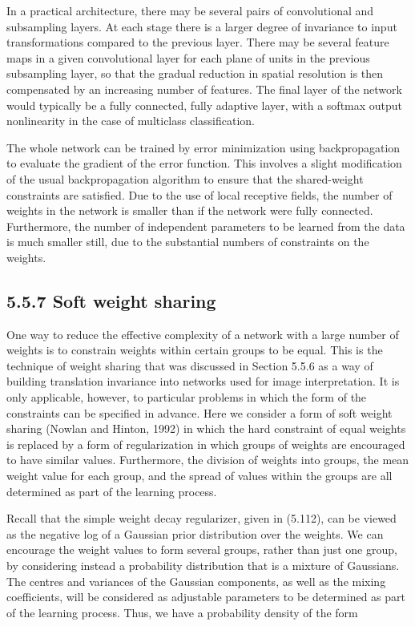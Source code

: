 \documentclass[
  10
]{article}
\begin{document}
In a practical architecture, there may be several pairs of convolutional
and subsampling layers. At each stage there is a larger degree of
invariance to input transformations compared to the previous layer.
There may be several feature maps in a given convolutional layer for
each plane of units in the previous subsampling layer, so that the
gradual reduction in spatial resolution is then compensated by an
increasing number of features. The final layer of the network would
typically be a fully connected, fully adaptive layer, with a softmax
output nonlinearity in the case of multiclass classification.

The whole network can be trained by error minimization using
backpropagation to evaluate the gradient of the error function. This
involves a slight modification of the usual backpropagation algorithm to
ensure that the shared-weight constraints are satisfied. Due to the use
of local receptive fields, the number of weights in the network is
smaller than if the network were fully connected. Furthermore, the
number of independent parameters to be learned from the data is much
smaller still, due to the substantial numbers of constraints on the
weights.

\subsection{5.5.7 Soft weight sharing}\label{soft-weight-sharing}

One way to reduce the effective complexity of a network with a large
number of weights is to constrain weights within certain groups to be
equal. This is the technique of weight sharing that was discussed in
Section 5.5.6 as a way of building translation invariance into networks
used for image interpretation. It is only applicable, however, to
particular problems in which the form of the constraints can be
specified in advance. Here we consider a form of soft weight sharing
(Nowlan and Hinton, 1992) in which the hard constraint of equal weights
is replaced by a form of regularization in which groups of weights are
encouraged to have similar values. Furthermore, the division of weights
into groups, the mean weight value for each group, and the spread of
values within the groups are all determined as part of the learning
process.

Recall that the simple weight decay regularizer, given in (5.112), can
be viewed as the negative log of a Gaussian prior distribution over the
weights. We can encourage the weight values to form several groups,
rather than just one group, by considering instead a probability
distribution that is a mixture of Gaussians. The centres and variances
of the Gaussian components, as well as the mixing coefficients, will be
considered as adjustable parameters to be determined as part of the
learning process. Thus, we have a probability density of the form
\end{document}
